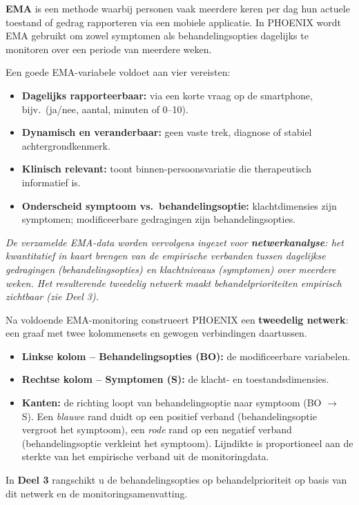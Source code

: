 \documentclass[11pt,a4paper]{article}
\begin{document}
\vspace{0.4em}
\begin{instrbox}[title={Ecological Momentary Assessment (EMA) -- basisprincipes}]
\small
\textbf{EMA} is een methode waarbij personen vaak meerdere keren per dag hun actuele
toestand of gedrag rapporteren via een mobiele applicatie. In PHOENIX wordt EMA
gebruikt om zowel symptomen als behandelingsopties dagelijks te monitoren over een periode
van meerdere weken.

Een goede EMA-variabele voldoet aan vier vereisten:
\begin{itemize}[topsep=2pt,itemsep=1pt]
\item \textbf{Dagelijks rapporteerbaar:} via een korte vraag op de smartphone, bijv.\ (ja/nee, aantal, minuten of 0--10).
\item \textbf{Dynamisch en veranderbaar:} geen vaste trek, diagnose of stabiel achtergrondkenmerk.
\item \textbf{Klinisch relevant:} toont binnen-persoonsvariatie die therapeutisch informatief is.
\item \textbf{Onderscheid symptoom vs.\ behandelingsoptie:} klachtdimensies zijn symptomen; modificeerbare gedragingen zijn behandelingsopties.
\end{itemize}
\smallskip\small
\textit{De verzamelde EMA-data worden vervolgens ingezet voor \textbf{netwerkanalyse}: het kwantitatief in kaart brengen van de empirische verbanden tussen dagelijkse gedragingen (behandelingsopties) en klachtniveaus (symptomen) over meerdere weken. Het resulterende tweedelig netwerk maakt behandelprioriteiten empirisch zichtbaar (zie Deel 3).}
\end{instrbox}

\vspace{0.4em}
\begin{instrbox}[title={Het tweedelig netwerk: structuur van het observatiemodel}]
\small
Na voldoende EMA-monitoring construeert PHOENIX een \textbf{tweedelig netwerk}:
een graaf met twee kolommensets en gewogen verbindingen daartussen.
\begin{itemize}[topsep=2pt,itemsep=1pt]
\item \textbf{Linkse kolom -- Behandelingsopties (BO):} de modificeerbare variabelen.
\item \textbf{Rechtse kolom -- Symptomen (S):} de klacht- en toestandsdimensies.
\item \textbf{Kanten:} de richting loopt van behandelingsoptie naar symptoom (BO $\rightarrow$ S).
Een \emph{blauwe} rand duidt op een positief verband (behandelingsoptie vergroot het symptoom),
een \emph{rode} rand op een negatief verband (behandelingsoptie verkleint het symptoom).
Lijndikte is proportioneel aan de sterkte van het empirische verband uit de monitoringdata.
\end{itemize}
In \textbf{Deel 3} rangschikt u de behandelingsopties op behandelprioriteit op basis van
dit netwerk en de monitoringsamenvatting.
\end{instrbox}
\end{document}

